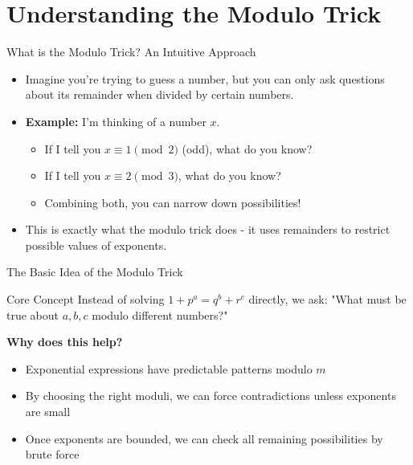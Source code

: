 \section{Understanding the Modulo Trick}

\begin{frame}{What is the Modulo Trick? An Intuitive Approach}
    \begin{itemize}
        \item Imagine you're trying to guess a number, but you can only ask questions about its remainder when divided by certain numbers.
        \item \textbf{Example:} I'm thinking of a number $x$.
        \begin{itemize}
            \item If I tell you $x \equiv 1 \pmod 2$ (odd), what do you know?
            \item If I tell you $x \equiv 2 \pmod 3$, what do you know?
            \item Combining both, you can narrow down possibilities!
        \end{itemize}
        \item This is exactly what the modulo trick does - it uses remainders to restrict possible values of exponents.
    \end{itemize}
\end{frame}

\begin{frame}{The Basic Idea of the Modulo Trick}
    \begin{block}{Core Concept}
        Instead of solving $1+p^a = q^b + r^c$ directly, we ask:
        "What must be true about $a,b,c$ modulo different numbers?"
    \end{block}

    \vspace{0.3cm}
    \textbf{Why does this help?}
    \begin{itemize}
        \item Exponential expressions have predictable patterns modulo $m$
        \item By choosing the right moduli, we can force contradictions unless exponents are small
        \item Once exponents are bounded, we can check all remaining possibilities by brute force
    \end{itemize}
\end{frame}
